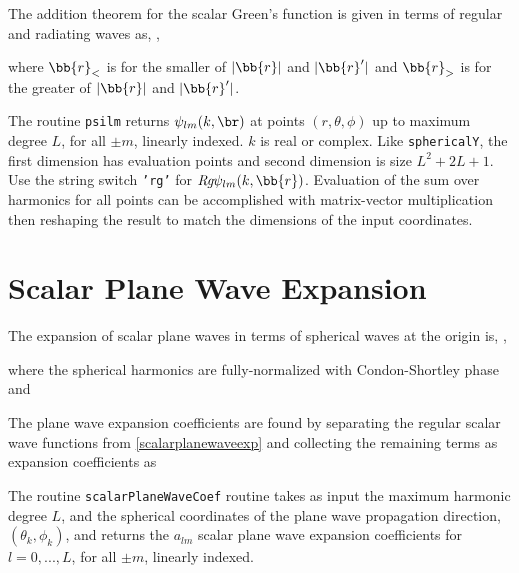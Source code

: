 The addition theorem for the scalar Green's function is given in terms of regular and radiating waves as, \cite{chew1995waves},

\noindent where $\bb{r}_{<}$ is for the smaller of $\vert \bb{r} \vert$ and $\vert \bb{r}'\vert $ and $\bb{r}_{>}$ is for the greater of $\vert \bb{r}\vert$ and $\vert \bb{r}'\vert$.


The routine \texttt{psilm} returns $\psi_{lm}(k,\br)$ at points $(r,\theta,\phi)$ up to maximum degree $L$, for all $\pm m$, linearly indexed.  $k$ is real or complex.  Like \texttt{sphericalY}, the first dimension has evaluation points and second dimension is size $L^2 + 2L+1$.  Use the string switch \texttt{'rg'} for $\textit{Rg} \psi_{lm}(k,\bb{r})$. Evaluation of the sum over harmonics for all points can be accomplished with matrix-vector multiplication then reshaping the result to match the dimensions of the input coordinates.

{\footnotesize
{}
}

\section{Scalar Plane Wave Expansion}

The expansion of scalar plane waves in terms of spherical waves at the origin is, \cite{tsang2000scattering},

\noindent where the spherical harmonics are fully-normalized with Condon-Shortley phase and 

The plane wave expansion coefficients are found by separating the regular scalar wave functions from \eqref{scalarplanewaveexp} and collecting the remaining terms as expansion coefficients as

The routine \texttt{scalarPlaneWaveCoef} routine takes as input the maximum harmonic degree $L$, and the spherical coordinates of the plane wave propagation direction, $(\theta_k, \phi_k)$, and returns the $a_{lm}$ scalar plane wave expansion coefficients for $l = 0,...,L$, for all $\pm m$, linearly indexed. 


